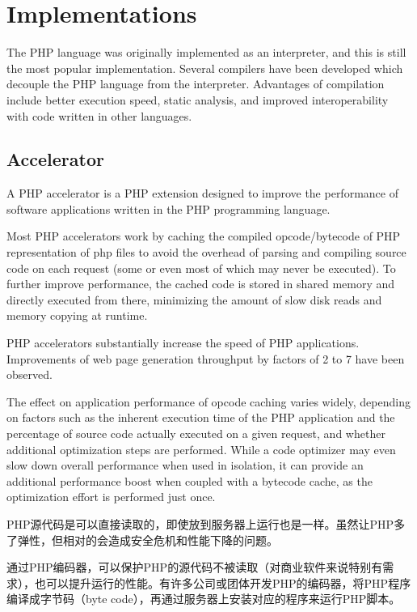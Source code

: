 \chapter{Implementations}


The PHP language was originally implemented as an interpreter, and this is still the most popular implementation. Several compilers have been developed which decouple the PHP language from the interpreter. Advantages of compilation include better execution speed, static analysis, and improved interoperability with code written in other languages.


\section{Accelerator}

A PHP accelerator\cite{php_accelerator} is a PHP extension designed to improve the performance of software applications written in the PHP programming language.



Most PHP accelerators work by caching the compiled opcode/bytecode of PHP representation of php files to avoid the overhead of parsing and compiling source code on each request (some or even most of which may never be executed). To further improve performance, the cached code is stored in shared memory and directly executed from there, minimizing the amount of slow disk reads and memory copying at runtime.

PHP accelerators substantially increase the speed of PHP applications. Improvements of web page generation throughput by factors of 2 to 7 have been observed.

The effect on application performance of opcode caching varies widely, depending on factors such as the inherent execution time of the PHP application and the percentage of source code actually executed on a given request, and whether additional optimization steps are performed. While a code optimizer may even slow down overall performance when used in isolation, it can provide an additional performance boost when coupled with a bytecode cache, as the optimization effort is performed just once.

PHP源代码是可以直接读取的，即使放到服务器上运行也是一样。虽然让PHP多了弹性，但相对的会造成安全危机和性能下降的问题。

通过PHP编码器，可以保护PHP的源代码不被读取（对商业软件来说特别有需求），也可以提升运行的性能。有许多公司或团体开发PHP的编码器，将PHP程序编译成字节码（byte code），再通过服务器上安装对应的程序来运行PHP脚本。

